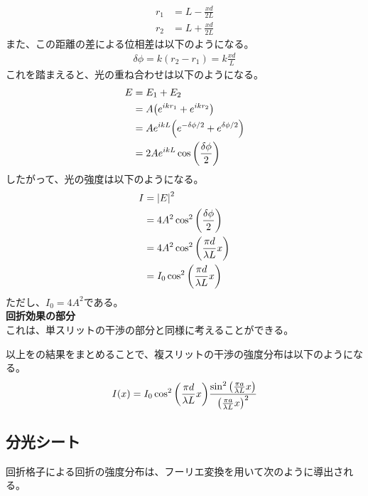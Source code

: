 \documentclass[a4paper,11pt]{jsarticle}
\begin{document}
\begin{align}
  r_1 &= L- \frac{xd}{2L}\\
  r_2 &= L+ \frac{xd}{2L}
\end{align}
また、この距離の差による位相差は以下のようになる。
\begin{align}
  \delta \phi = k(r_2 - r_1) = k\frac{xd}{L}
\end{align}
これを踏まえると、光の重ね合わせは以下のようになる。
\begin{align}
  E &= E_1 + E_2\\
  &= A\qty(e^{ikr_1} + e^{ikr_2})\\
  &= Ae^{ikL}\qty(e^{-\delta \phi/2} + e^{\delta \phi/2})\\
  &= 2Ae^{ikL}\cos\qty(\frac{\delta \phi}{2})
\end{align}
したがって、光の強度は以下のようになる。
\begin{align}
  I &= \abs{E}^2 \\
  &= 4A^2\cos^2\qty(\frac{\delta \phi}{2})\\
  &= 4A^2\cos^2\qty(\frac{\pi d}{\lambda L}x)\\
  &= I_0 \cos^2\qty(\frac{\pi d}{\lambda L}x)
\end{align}
ただし、$I_0 = 4A^2$である。\\

\textbf{回折効果の部分}\\
これは、単スリットの干渉の部分と同様に考えることができる。

以上をの結果をまとめることで、複スリットの干渉の強度分布は以下のようになる。
\begin{align}
  I(x) = I_0 \cos^2\qty(\frac{\pi d}{\lambda L}x)\frac{\sin^2\qty(\frac{\pi a}{\lambda L}x)}{\qty(\frac{\pi a}{\lambda L}x)^2}
\end{align}

\subsection{分光シート}
回折格子による回折の強度分布は、フーリエ変換を用いて次のように導出される。
\end{document}
